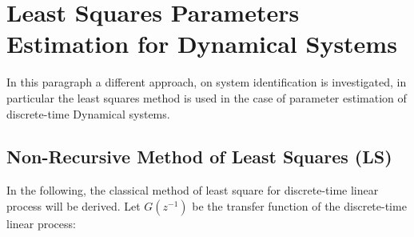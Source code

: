 \documentclass[11pt,a4paper,oneside]{book}
\numberwithin{equation}{section}
\theoremstyle{it}
\theoremstyle{definition}
\begin{document}
\chapter{Least Squares Parameters Estimation for Dynamical Systems}
In this paragraph a different approach, on system identification is 
investigated, in particular the least squares method is used in the case of 
parameter estimation of discrete-time Dynamical systems.

\section{Non-Recursive Method of Least Squares (LS)}
In the following, the classical method of least square for discrete-time linear 
process will be derived. 
Let $G(z^{-1})$ be the transfer function of the discrete-time linear process:
\end{document}
